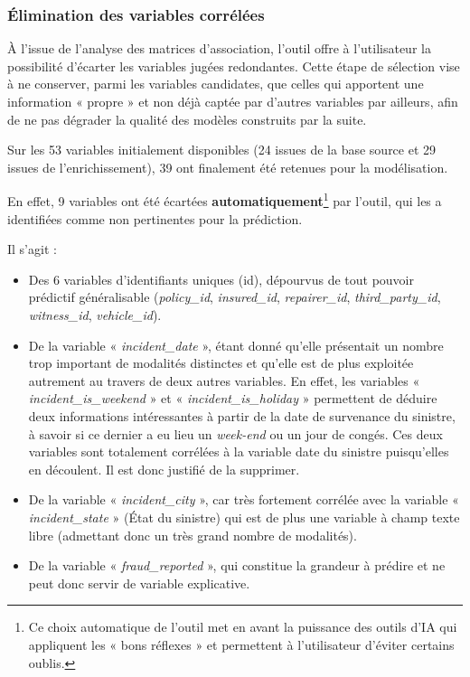 \subsubsection{Élimination des variables corrélées}

À l'issue de l'analyse des matrices d'association, l'outil offre à l'utilisateur la possibilité d'écarter les variables jugées redondantes. Cette étape de sélection vise à ne conserver, parmi les variables candidates, que celles qui apportent une information « propre » et non déjà captée par d'autres variables par ailleurs, afin de ne pas dégrader la qualité des modèles construits par la suite.

Sur les 53 variables initialement disponibles (24 issues de la base source et 29 issues de l'enrichissement), 39 ont finalement été retenues pour la modélisation.

En effet, 9 variables ont été écartées \textbf{automatiquement}\footnote{Ce choix automatique de l'outil met en avant la puissance des outils d'IA qui appliquent les « bons réflexes » et permettent à l'utilisateur d'éviter certains oublis.} par l'outil, qui les a identifiées comme non pertinentes pour la prédiction.

Il s'agit :

\begin{itemize}[label=$\bullet$]
    \item Des 6 variables d'identifiants uniques (id), dépourvus de tout pouvoir prédictif généralisable (\textit{policy\_id}, \textit{insured\_id}, \textit{repairer\_id}, \textit{third\_party\_id}, \textit{witness\_id}, \textit{vehicle\_id}).
    \item De la variable « \textit{incident\_date} », étant donné qu'elle présentait un nombre trop important de modalités distinctes et qu'elle est de plus exploitée autrement au travers de deux autres variables. En effet, les variables « \textit{incident\_is\_weekend} » et « \textit{incident\_is\_holiday} » permettent de déduire deux informations intéressantes à partir de la date de survenance du sinistre, à savoir si ce dernier a eu lieu un \textit{week-end} ou un jour de congés. Ces deux variables sont totalement corrélées à la variable date du sinistre puisqu'elles en découlent. Il est donc justifié de la supprimer.
    \item De la variable « \textit{incident\_city} », car très fortement corrélée avec la variable « \textit{incident\_state} » (État du sinistre) qui est de plus une variable à champ texte libre (admettant donc un très grand nombre de modalités).
    \item De la variable « \textit{fraud\_reported} », qui constitue la grandeur à prédire et ne peut donc servir de variable explicative.
\end{itemize}

